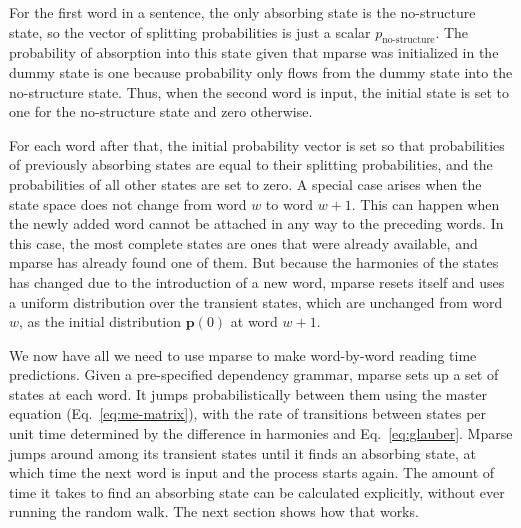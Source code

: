 \documentclass[a4paper, 12pt]{article}
\begin{document}
For the first word in a sentence, the only absorbing state is the
no-structure state, so the vector of splitting probabilities is just a scalar
$p_{\text{no-structure}}$. The probability of absorption into this state given
that mparse was initialized in the dummy state is one because probability only
flows from the dummy state into the no-structure state. Thus, when the second
word is input, the initial state is set to one for the no-structure state and
zero otherwise.

For each word after that, the initial probability vector is set so that
probabilities of previously absorbing states are equal to their splitting
probabilities, and the probabilities of all other states are set to zero. A
special case arises when the state space does not change from word $w$ to word
$w + 1$. This can happen when the newly added word cannot be attached in any
way to the preceding words. In this case, the most complete states are ones
that were already available, and mparse has already found one of them. But
because the harmonies of the states has changed due to the introduction of a
new word, mparse resets itself and uses a uniform distribution over the
transient states, which are unchanged from word $w$, as the initial
distribution $\mathbf{p}(0)$ at word $w + 1$. 

We now have all we need to use mparse to make word-by-word reading time
predictions. Given a pre-specified dependency grammar, mparse sets up a set of
states at each word. It jumps probabilistically between them using the master
equation (Eq.~\ref{eq:me-matrix}), with the rate of transitions between states
per unit time determined by the difference in harmonies and
Eq.~\ref{eq:glauber}. Mparse jumps around among its transient states until it
finds an absorbing state, at which time the next word is input and the process
starts again. The amount of time it takes to find an absorbing state can be
calculated explicitly, without ever running the random walk. The next section shows how
that works.
\end{document}
